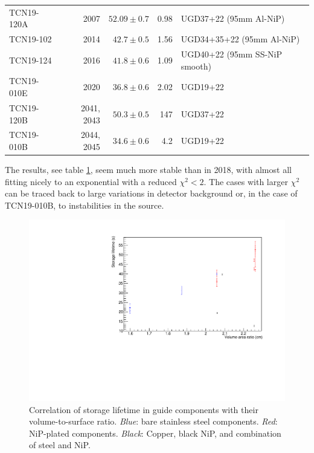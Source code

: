 \documentclass[10pt,letterpaper]{article}
\begin{document}
\begin{table}
\begin{tabular}{l r r r l}
TCN19-120A & 2007 & $52.09 \pm 0.7$ & 0.98 & UGD37+22 (95mm Al-NiP) \\
TCN19-102 & 2014 & $42.7 \pm 0.5$ & 1.56 & UGD34+35+22 (95mm Al-NiP) \\
TCN19-124 & 2016 & $41.8 \pm 0.6$ & 1.09 & UGD40+22 (95mm SS-NiP smooth) \\
TCN19-010E & 2020 & $36.8 \pm 0.6$ & 2.02 & UGD19+22 \\
TCN19-120B & 2041, 2043 & \sout{$50.3 \pm 0.5$} & 147 & UGD37+22 \\
TCN19-010B & 2044, 2045 & \sout{$34.6 \pm 0.6$} & 4.2 & UGD19+22 \\
\bottomrule
\end{tabular}
\label{tab:storagelifetime_with_monitor}
\end{table}

The results, see table \ref{tab:storagelifetime_with_monitor}, seem much more stable than in 2018, with almost all fitting nicely to an exponential with a reduced $\chi^2 < 2$. The cases with larger $\chi^2$ can be traced back to large variations in detector background or, in the case of TCN19-010B, to instabilities in the source.

\begin{figure}
\centering
\includegraphics[width=\textwidth,page=1]{../storagelifetime_with_monitor/VA.pdf}
\caption{Correlation of storage lifetime in guide components with their volume-to-surface ratio. \textit{Blue}: bare stainless steel components. \textit{Red}: NiP-plated components. \textit{Black}: Copper, black NiP, and combination of steel and NiP.}
\label{fig:storageVA}
\end{figure}
\end{document}
